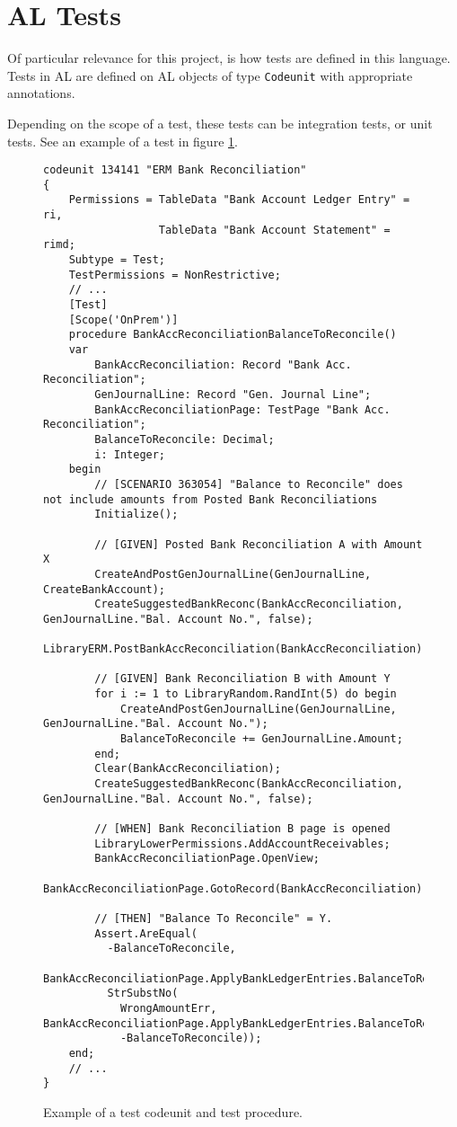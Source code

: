 \section{AL Tests}

Of particular relevance for this project, is how tests are defined in this language. Tests in AL are defined
 on AL objects of type \texttt{Codeunit} with appropriate annotations.

Depending on the scope of a test, these tests can be integration tests, or unit tests. See
an example of a test in figure \ref{f:app-al-test}.

\begin{figure}
    \begin{Verbatim}[fontsize=\small]
codeunit 134141 "ERM Bank Reconciliation"
{
    Permissions = TableData "Bank Account Ledger Entry" = ri,
                  TableData "Bank Account Statement" = rimd;
    Subtype = Test;
    TestPermissions = NonRestrictive;
    // ...
    [Test]
    [Scope('OnPrem')]
    procedure BankAccReconciliationBalanceToReconcile()
    var
        BankAccReconciliation: Record "Bank Acc. Reconciliation";
        GenJournalLine: Record "Gen. Journal Line";
        BankAccReconciliationPage: TestPage "Bank Acc. Reconciliation";
        BalanceToReconcile: Decimal;
        i: Integer;
    begin
        // [SCENARIO 363054] "Balance to Reconcile" does not include amounts from Posted Bank Reconciliations
        Initialize();

        // [GIVEN] Posted Bank Reconciliation A with Amount X
        CreateAndPostGenJournalLine(GenJournalLine, CreateBankAccount);
        CreateSuggestedBankReconc(BankAccReconciliation, GenJournalLine."Bal. Account No.", false);
        LibraryERM.PostBankAccReconciliation(BankAccReconciliation);

        // [GIVEN] Bank Reconciliation B with Amount Y
        for i := 1 to LibraryRandom.RandInt(5) do begin
            CreateAndPostGenJournalLine(GenJournalLine, GenJournalLine."Bal. Account No.");
            BalanceToReconcile += GenJournalLine.Amount;
        end;
        Clear(BankAccReconciliation);
        CreateSuggestedBankReconc(BankAccReconciliation, GenJournalLine."Bal. Account No.", false);

        // [WHEN] Bank Reconciliation B page is opened
        LibraryLowerPermissions.AddAccountReceivables;
        BankAccReconciliationPage.OpenView;
        BankAccReconciliationPage.GotoRecord(BankAccReconciliation);

        // [THEN] "Balance To Reconcile" = Y.
        Assert.AreEqual(
          -BalanceToReconcile,
          BankAccReconciliationPage.ApplyBankLedgerEntries.BalanceToReconcile.AsDEcimal,
          StrSubstNo(
            WrongAmountErr, BankAccReconciliationPage.ApplyBankLedgerEntries.BalanceToReconcile.Caption,
            -BalanceToReconcile));
    end;
    // ...
}
    \end{Verbatim}
    \caption{Example of a test codeunit and test procedure.}
    \label{f:app-al-test}
\end{figure}

